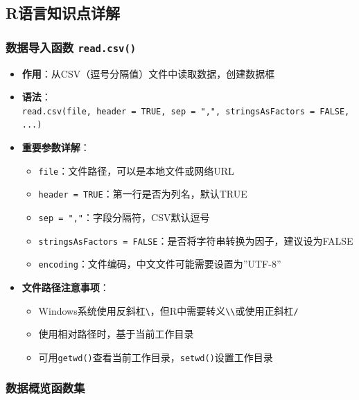 \documentclass[
  twoside]{book}
\providecommand{\tightlist}{%
  \setlength{\itemsep}{0pt}\setlength{\parskip}{0pt}}
\begin{document}
\hypertarget{rux8bedux8a00ux77e5ux8bc6ux70b9ux8be6ux89e3-4}{%
\subsection{R语言知识点详解}\label{rux8bedux8a00ux77e5ux8bc6ux70b9ux8be6ux89e3-4}}

\hypertarget{ux6570ux636eux5bfcux5165ux51fdux6570-read.csv}{%
\subsubsection{\texorpdfstring{数据导入函数 \texttt{read.csv()}}{数据导入函数 read.csv()}}\label{ux6570ux636eux5bfcux5165ux51fdux6570-read.csv}}

\begin{itemize}
\tightlist
\item
  \textbf{作用}：从CSV（逗号分隔值）文件中读取数据，创建数据框
\item
  \textbf{语法}：\texttt{read.csv(file,\ header\ =\ TRUE,\ sep\ =\ ",",\ stringsAsFactors\ =\ FALSE,\ ...)}
\item
  \textbf{重要参数详解}：

  \begin{itemize}
  \tightlist
  \item
    \texttt{file}：文件路径，可以是本地文件或网络URL
  \item
    \texttt{header\ =\ TRUE}：第一行是否为列名，默认TRUE
  \item
    \texttt{sep\ =\ ","}：字段分隔符，CSV默认逗号
  \item
    \texttt{stringsAsFactors\ =\ FALSE}：是否将字符串转换为因子，建议设为FALSE
  \item
    \texttt{encoding}：文件编码，中文文件可能需要设置为''UTF-8''
  \end{itemize}
\item
  \textbf{文件路径注意事项}：

  \begin{itemize}
  \tightlist
  \item
    Windows系统使用反斜杠\texttt{\textbackslash{}}，但R中需要转义\texttt{\textbackslash{}\textbackslash{}}或使用正斜杠\texttt{/}
  \item
    使用相对路径时，基于当前工作目录
  \item
    可用\texttt{getwd()}查看当前工作目录，\texttt{setwd()}设置工作目录
  \end{itemize}
\end{itemize}

\hypertarget{ux6570ux636eux6982ux89c8ux51fdux6570ux96c6}{%
\subsubsection{数据概览函数集}\label{ux6570ux636eux6982ux89c8ux51fdux6570ux96c6}}
\end{document}
